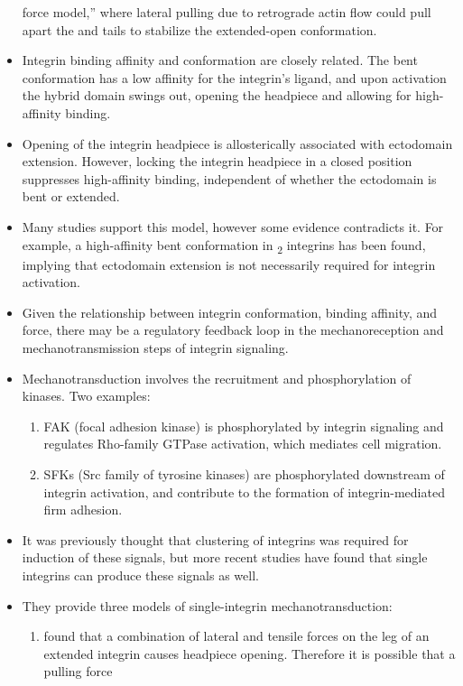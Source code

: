 \documentclass[
10pt, %
letterpaper, %
twocolumn, %
landscape %
]{article}
\newcommand{\inta}[1]{\textalpha\textsubscript{#1}}
\newcommand{\intb}[1]{\textbeta\textsubscript{#1}}
\begin{document}
\begin{itemize}
  force model,'' where lateral pulling due to retrograde actin flow
  could pull apart the \inta{} and \intb{} tails to stabilize the
  extended-open conformation.
\item Integrin binding affinity and conformation are closely
  related. The bent conformation has a low affinity for the integrin's
  ligand, and upon activation the hybrid domain swings out, opening
  the headpiece and allowing for high-affinity binding. 
\item Opening of the integrin headpiece is allosterically associated
  with ectodomain extension. However, locking the integrin headpiece
  in a closed position suppresses high-affinity binding, independent
  of whether the ectodomain is bent or extended.
\item Many studies support this model, however some evidence
  contradicts it. For example, a high-affinity bent conformation in
  \intb{2} integrins has been found, implying that ectodomain
  extension is not necessarily required for integrin activation.
\item Given the relationship between integrin conformation, binding
  affinity, and force, there may be a regulatory feedback loop in the
  mechanoreception and mechanotransmission steps of integrin
  signaling.
\item Mechanotransduction involves the recruitment and phosphorylation
  of kinases. Two examples:
  \begin{enumerate}
  \item FAK (focal adhesion kinase) is phosphorylated by integrin
    signaling and regulates Rho-family GTPase activation, which
    mediates cell migration.
  \item SFKs (Src family of tyrosine kinases) are phosphorylated
    downstream of integrin activation, and contribute to the formation
    of integrin-mediated firm adhesion.
  \end{enumerate}
\item It was previously thought that clustering of integrins was
  required for induction of these signals, but more recent studies
  have found that single integrins can produce these signals as well.
\item They provide three models of single-integrin
  mechanotransduction:
  \begin{enumerate}
  \item \cite{Zhu2008b} found that a combination of lateral and
    tensile forces on the \intb{} leg of an extended integrin causes
    headpiece opening. Therefore it is possible that a pulling force

\end{enumerate}
\end{itemize}
\end{document}
